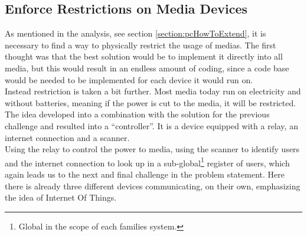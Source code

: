 \subsection{Enforce Restrictions on Media Devices}
As mentioned in the analysis, see section \ref{section:pcHowToExtend}, it is necessary to find a way to physically restrict the usage of medias. The first thought was that the best solution would be to implement it directly into all media, but this would result in an endless amount of coding, since a code base would be needed to be implemented for each device it would run on.\\
Instead restriction is taken a bit further. Most media today run on electricity and without batteries, meaning if the power is cut to the media, it will be restricted.\\
The idea developed into a combination with the solution for the previous challenge and resulted into a ``controller''. It is a device equipped with a relay, an internet connection and a scanner.\\
Using the relay to control the power to media, using the scanner to identify users and the internet connection to look up in a sub-global\footnote{Global in the scope of each families system.} register of users, which again leads us to the next and final challenge in the problem statement. Here there is already three different devices communicating, on their own, emphasizing the idea of Internet Of Things.


